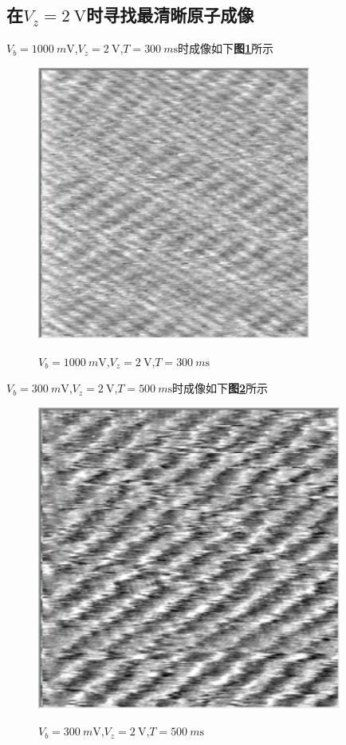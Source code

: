 \documentclass[a4paper]{article}
\begin{document}
\subsection{在$V_z=\SI{2}{\volt}$时寻找最清晰原子成像}\label{sub:3}
$V_b=\SI{1000}{m\volt}$,$V_z=\SI{2}{\volt}$,$T=\SI{300}{m\s}$时成像如下\textbf{图\ref{result:fig7}}所示
\begin{figure}[H]
 \centering
 \caption{$V_b=\SI{1000}{m\volt}$,$V_z=\SI{2}{\volt}$,$T=\SI{300}{m\s}$}
 \includegraphics[height=9cm, width=9cm]{images/2V-1000mV-300ms.png}
 \label{result:fig7}
\end{figure}
$V_b=\SI{300}{m\volt}$,$V_z=\SI{2}{\volt}$,$T=\SI{500}{m\s}$时成像如下\textbf{图\ref{result:fig8}}所示
\begin{figure}[H]
 \centering
 \caption{$V_b=\SI{300}{m\volt}$,$V_z=\SI{2}{\volt}$,$T=\SI{500}{m\s}$}
 \includegraphics[height=10cm, width=10cm]{images/2v-300mv-500ms.png}
 \label{result:fig8}
\end{figure}
\end{document}
